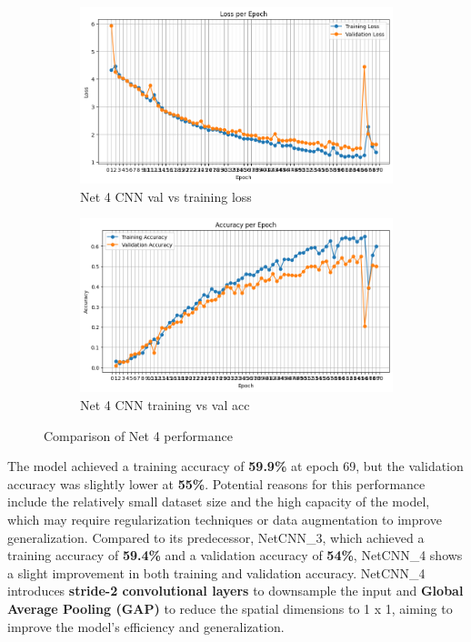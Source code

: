\documentclass[12pt]{article}
\begin{document}
\begin{figure}[ht]
    \centering
    \begin{subfigure}{0.45\linewidth}
        \centering
        \includegraphics[width=\linewidth]{net4_loss.png}
        \caption{Net 4 CNN val vs training loss}
        \label{fig:net4_loss}
    \end{subfigure}
    \hfill
    \begin{subfigure}{0.45\linewidth}
        \centering
        \includegraphics[width=\linewidth]{net4_acc.png}
        \caption{Net 4 CNN training vs val acc }
        \label{fig:net4_acc}
    \end{subfigure}
    \caption{Comparison of Net 4 performance}
    \label{fig:net4_performance}
\end{figure}

The model achieved a training accuracy of \textbf{59.9\%} at epoch 69, but the validation accuracy was slightly lower at \textbf{55\%}. Potential reasons for this performance include the relatively small dataset size and the high capacity of the model, which may require regularization techniques or data augmentation to improve generalization. Compared to its predecessor, NetCNN\_3, which achieved a training accuracy of \textbf{59.4\%} and a validation accuracy of \textbf{54\%}, NetCNN\_4 shows a slight improvement in both training and validation accuracy. NetCNN\_4 introduces \textbf{stride-2 convolutional layers} to downsample the input and \textbf{Global Average Pooling (GAP)} to reduce the spatial dimensions to 1 x 1, aiming to improve the model's efficiency and generalization.
\end{document}
